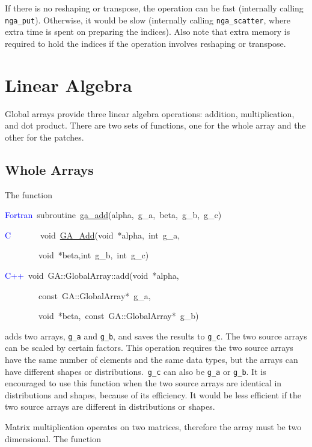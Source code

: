 If there is no reshaping or transpose, the operation can be fast (internally
calling \texttt{nga\_put}). Otherwise, it would be slow (internally
calling \texttt{nga\_scatter}, where extra time is spent on preparing
the indices). Also note that extra memory is required to hold the
indices if the operation involves reshaping or transpose. 


\section{Linear Algebra }

Global arrays provide three linear algebra operations: addition, multiplication,
and dot product. There are two sets of functions, one for the whole
array and the other for the patches. 


\subsection{Whole Arrays }

The function

\textcolor{blue}{Fortran}~subroutine~\href{https://hpc.pnl.gov/globalarrays/api/f_op_api.html\#ga_add}{ga\_{}add}(alpha,~g\_a,~beta,~g\_b,~g\_c)~

\textcolor{blue}{C}~~~~~~~void~\href{https://hpc.pnl.gov/globalarrays/api/c_op_api.html\#ga_add}{GA\_{}Add}(void~{*}alpha,~int~g\_a,~

~~~~~~~~void~{*}beta,int~g\_b,~int~g\_c)~

\textcolor{blue}{C++}~void~GA::GlobalArray::add(void~{*}alpha,~~

~~~~~~~~const~GA::GlobalArray{*}~g\_a,~

~~~~~~~~void~{*}beta,~const~GA::GlobalArray{*}~g\_b)

adds two arrays, \texttt{g\_a} and \texttt{g\_b}, and saves the results
to \texttt{g\_c}. The two source arrays can be scaled by certain factors.
This operation requires the two source arrays have the same number
of elements and the same data types, but the arrays can have different
shapes or distributions.\texttt{ g\_c} can also be \texttt{g\_a} or
\texttt{g\_b}. It is encouraged to use this function when the two
source arrays are identical in distributions and shapes, because of
its efficiency. It would be less efficient if the two source arrays
are different in distributions or shapes.

Matrix multiplication operates on two matrices, therefore the array
must be two dimensional. The function

